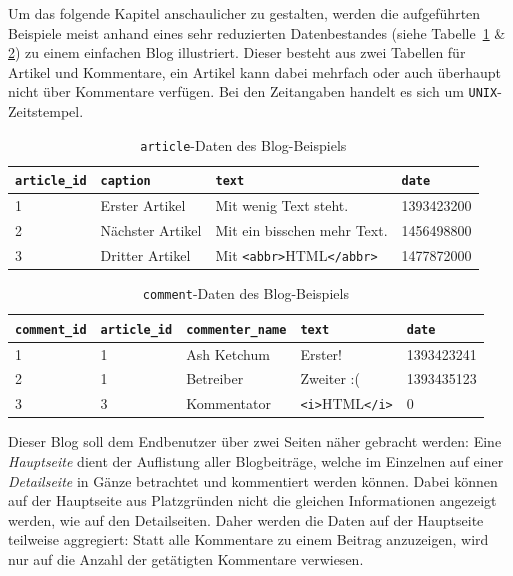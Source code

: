 Um das folgende Kapitel anschaulicher zu gestalten, werden die aufgeführten Beispiele meist anhand eines sehr reduzierten Datenbestandes (siehe Tabelle~\ref{tab:ui-concept-data-article} \& \ref{tab:ui-concept-data-comment}) zu einem einfachen Blog illustriert. Dieser besteht aus zwei Tabellen für Artikel und Kommentare, ein Artikel kann dabei mehrfach oder auch überhaupt nicht über Kommentare verfügen. Bei den Zeitangaben handelt es sich um \texttt{UNIX}-Zeitstempel.

\begin{table}[h]
  \centering
  \begin{tabularx}{\linewidth}{ l l X l }
    \texttt{article\_id}&\texttt{caption}&\texttt{text}&\texttt{date}\\
    \hline
    1&Erster Artikel&Mit wenig Text steht.&1393423200\\
    2&Nächster Artikel&Mit ein bisschen mehr Text.&1456498800\\
    3&Dritter Artikel&Mit \texttt{<abbr>}HTML\texttt{</abbr>}&1477872000\\
  \end{tabularx}
  \caption{\texttt{article}-Daten des Blog-Beispiels}
  \label{tab:ui-concept-data-article}
\end{table}

\begin{table}[h]
  \centering
  \begin{tabularx}{\linewidth}{ l l l X l }
    \texttt{comment\_id}&\texttt{article\_id}&\texttt{commenter\_name}&\texttt{text}&\texttt{date}\\
    \hline
    1&1&Ash Ketchum&Erster!&1393423241\\
    2&1&Betreiber&Zweiter :(&1393435123\\
    3&3&Kommentator&\texttt{<i>}HTML\texttt{</i>}&0\\
  \end{tabularx}
  \caption{\texttt{comment}-Daten des Blog-Beispiels}
  \label{tab:ui-concept-data-comment}
\end{table}

Dieser Blog soll dem Endbenutzer über zwei Seiten näher gebracht werden: Eine \textit{Hauptseite} dient der Auflistung aller Blogbeiträge, welche im Einzelnen auf einer \textit{Detailseite} in Gänze betrachtet und kommentiert werden können. Dabei können auf der Hauptseite aus Platzgründen nicht die gleichen Informationen angezeigt werden, wie auf den Detailseiten. Daher werden die Daten auf der Hauptseite teilweise aggregiert: Statt alle Kommentare zu einem Beitrag anzuzeigen, wird nur auf die Anzahl der getätigten Kommentare verwiesen.

